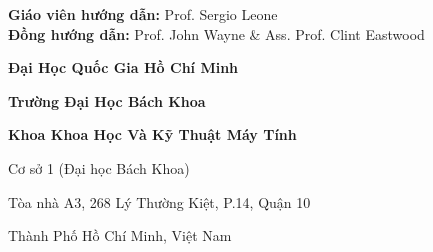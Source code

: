 \thispagestyle{empty} %
\noindent
\sffamily

\large
\vspace*{\fill}
\hspace{-0.52cm}\textbf{Giáo viên hướng dẫn:} Prof. Sergio Leone\\
\textbf{Đồng hướng dẫn:} Prof. John Wayne \& Ass. Prof. Clint Eastwood
\vspace{5cm}

\small
\hspace*{\fill}\textbf{Đại Học Quốc Gia Hồ Chí Minh}

\hspace*{\fill}\textbf{Trường Đại Học Bách Khoa}

\hspace*{\fill}\textbf{Khoa Khoa Học Và Kỹ Thuật Máy Tính}

\hspace*{\fill}Cơ sở 1 (Đại học Bách Khoa)

\hspace*{\fill}Tòa nhà A3, 268 Lý Thường Kiệt, P.14, Quận 10

\hspace*{\fill} Thành Phố Hồ Chí Minh, Việt Nam


\normalsize
\normalfont
\vspace*{2cm}
